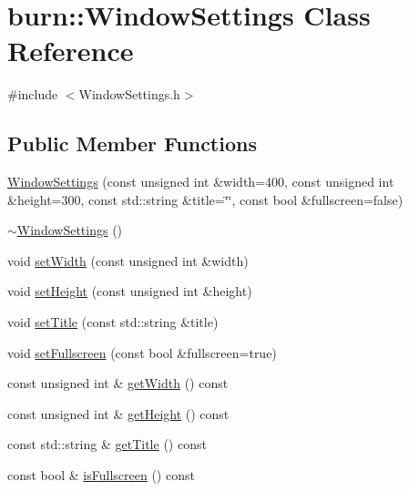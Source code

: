 \hypertarget{classburn_1_1_window_settings}{\section{burn\-:\-:Window\-Settings Class Reference}
\label{classburn_1_1_window_settings}
}


{\ttfamily \#include $<$Window\-Settings.\-h$>$}

\subsection*{Public Member Functions}
\begin{DoxyCompactItemize}
\item 
\hyperlink{classburn_1_1_window_settings_afad87ac1cc0fc38729d5f2d2c073dc58}{Window\-Settings} (const unsigned int \&width=400, const unsigned int \&height=300, const std\-::string \&title=\char`\"{}\char`\"{}, const bool \&fullscreen=false)
\item 
\hyperlink{classburn_1_1_window_settings_a7ce3e5e4cee8bd804519c96e6f35c136}{$\sim$\-Window\-Settings} ()
\item 
void \hyperlink{classburn_1_1_window_settings_aea8c01713c043323181a49559b223b31}{set\-Width} (const unsigned int \&width)
\item 
void \hyperlink{classburn_1_1_window_settings_a9fd838b0e2d53de939da4a11aa696700}{set\-Height} (const unsigned int \&height)
\item 
void \hyperlink{classburn_1_1_window_settings_ab3e290d74fdd3a39bfea8f2b48fd7036}{set\-Title} (const std\-::string \&title)
\item 
void \hyperlink{classburn_1_1_window_settings_a40cbbd8c1fe6303176f947c75a49368a}{set\-Fullscreen} (const bool \&fullscreen=true)
\item 
const unsigned int \& \hyperlink{classburn_1_1_window_settings_a52ab177b1d13ce1a3623f093d0a59b96}{get\-Width} () const 
\item 
const unsigned int \& \hyperlink{classburn_1_1_window_settings_a9cca56ebd1c101ccd470989a7b472378}{get\-Height} () const 
\item 
const std\-::string \& \hyperlink{classburn_1_1_window_settings_ab0e0c2ae932c94deda5d7523d9dc5a77}{get\-Title} () const 
\item 
const bool \& \hyperlink{classburn_1_1_window_settings_a9d142978442ffa08540b348fe62ecca1}{is\-Fullscreen} () const 
\end{DoxyCompactItemize}


